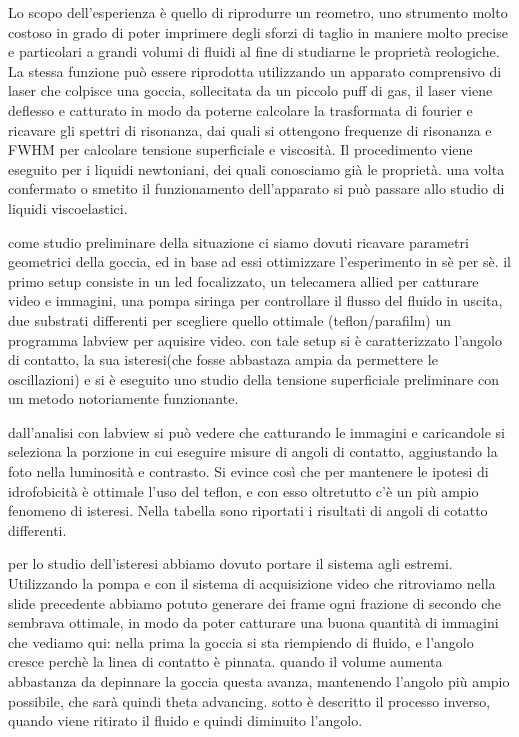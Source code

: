 Lo scopo dell'esperienza è quello di riprodurre un reometro, uno strumento molto costoso in grado di poter imprimere degli sforzi di taglio in maniere molto precise e particolari a grandi volumi di fluidi al fine di studiarne le proprietà reologiche. La stessa funzione può essere riprodotta utilizzando un apparato comprensivo di laser che colpisce una goccia, sollecitata da un piccolo puff di gas, il laser viene deflesso e catturato in modo da poterne calcolare la trasformata di fourier e ricavare gli spettri di risonanza, dai quali si ottengono frequenze di risonanza e FWHM per calcolare tensione superficiale e viscosità. Il procedimento viene eseguito per i liquidi newtoniani, dei quali conosciamo già le proprietà. una volta confermato o smetito il funzionamento dell'apparato si può passare allo studio di liquidi viscoelastici.

come studio preliminare della situazione ci siamo dovuti ricavare parametri geometrici della goccia, ed in base ad essi ottimizzare l'esperimento in sè per sè. il primo setup consiste in un led focalizzato, un telecamera allied per catturare video e immagini, una pompa siringa per controllare il flusso del fluido in uscita, due substrati differenti per scegliere quello ottimale (teflon/parafilm) un programma labview per aquisire video. con tale setup si è caratterizzato l'angolo di contatto, la sua isteresi(che fosse abbastaza ampia da permettere le oscillazioni) e si è eseguito uno studio della tensione superficiale preliminare con un metodo notoriamente funzionante.

dall'analisi con labview si può vedere che catturando le immagini e caricandole si seleziona la porzione in cui eseguire misure di angoli di contatto, aggiustando la foto nella luminosità e contrasto. Si evince così che per mantenere le ipotesi di idrofobicità è ottimale l'uso del teflon, e con esso oltretutto c'è un più ampio fenomeno di isteresi.
Nella tabella sono riportati i risultati di angoli di cotatto differenti.

per lo studio dell'isteresi abbiamo dovuto portare il sistema agli estremi. Utilizzando la pompa e con il sistema di acquisizione video che ritroviamo nella slide precedente abbiamo potuto generare dei frame ogni frazione di secondo che sembrava ottimale, in modo da poter catturare una buona quantità di immagini che vediamo qui: nella prima la goccia si sta riempiendo di fluido, e l'angolo cresce perchè la linea di contatto è pinnata. quando il volume aumenta abbastanza da depinnare la goccia questa avanza, mantenendo l'angolo più ampio possibile, che sarà quindi theta advancing. sotto è descritto il processo inverso, quando viene ritirato il fluido e quindi diminuito l'angolo.

